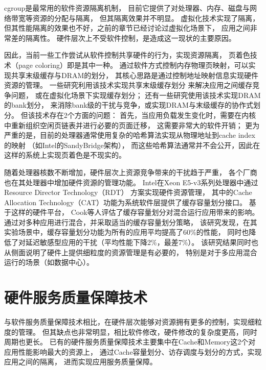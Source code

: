 cgroup\cite{cgroup}是最常用的软件资源隔离机制，
目前它提供了对处理器、内存、磁盘与网络带宽等资源的分配与隔离，
但其隔离效果并不明显。
虚拟化技术实现了隔离，但其性能隔离的效果也不好，之前的章节已经讨论过虚拟化场景下，
应用之间非常差的隔离性。
硬件层次上不受软件控制，是造成这一现状的主要原因。

因此，当前一些工作尝试从软件控制共享硬件的行为，实现资源隔离，
页着色技术（page coloring）即是其中一种。
通过软件方式控制内存物理页映射，可以实现共享末级缓存与DRAM的划分，
其核心思路是通过控制地址映射信息实现硬件资源的管理。
一些研究利用该技术实现共享末级缓存划分\cite{lin_gaining_2008, tam_managing_2007}
来解决应用之间缓存竞争问题，
或在虚拟化场景下实现缓存划分\cite{Jin2009, Chen2010, Wang2012}；
还有一些研究\cite{liu_software_2012}使用该技术实现DRAM的bank划分，
来消除bank级的干扰与竞争，或实现DRAM与末级缓存的协作式划分\cite{Liu:2014:ISCA}。
但该技术存在2个方面的问题：
首先，当应用负载发生变化时，需要在内核中重新组织空闲页链表并进行必要的页面迁移，
这需要非常大的软件开销；
更为严重的是，目前的处理器通常使用复杂的哈希算法实现从物理地址到cache index的映射
（如Intel的SandyBridge架构），
而这些哈希算法通常并不会公开，因此在这样的系统上实现页着色是不现实的。

随着处理器核数不断增加，硬件层次上资源竞争带来的干扰趋于严重，
各个厂商也在其处理器中增加硬件资源的管理功能。
Intel在Xeon E5-v3系列处理器中通过Resource Director Technology（RDT）\cite{intel-rdt}
方案实现硬件资源管理，
其中的Cache Allocation Technology（CAT）功能为系统软件层提供了缓存容量划分接口。
基于这样的硬件平台，
Cook等人\cite{cook_hardware_2013}评估了缓存容量划分对混合运行应用带来的影响。
通过对多种应用进行混合，并采取适当的缓存容量划分策略，
该研究发现，在其实验场景中，缓存容量划分功能为所有的应用平均提高了60\%的性能，
同时也降低了对延迟敏感型应用的干扰（平均性能下降2\%，最差7\%）。
该研究结果同时也从侧面说明了硬件上提供细粒度的资源管理是有必要的，
特别是对于多应用混合运行的场景（如数据中心）。



\section{硬件服务质量保障技术}

与软件服务质量保障技术相比，在硬件层次能够对资源拥有更多的控制，实现细粒度的管理。
但其缺点也非常明显，相比软件修改，硬件修改的复杂度更高，同时周期也更长。
已有的硬件服务质量保障技术主要集中在Cache和Memory这2个对应用性能影响最大的资源上，
通过Cache容量划分、访存调度与划分的方式，实现应用之间的隔离，
进而实现应用服务质量保障。

